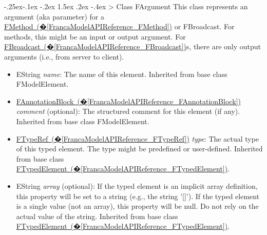 \documentclass[a4paper,10pt]{scrreprt}
\makeatletter
\renewcommand\subsection{\medskip\@startsection{subsection}{2}{\z@}%
  {-.25ex\@plus -.1ex \@minus -.2ex}%
  {1.5ex \@plus .2ex \@minus -.4ex}%
  {\ifnum \scr@compatibility>\@nameuse{scr@v@2.96}\relax
    \setlength{\parfillskip}{\z@ plus 1fil}\fi
    \raggedsection\normalfont\sectfont\nobreak\size@subsection
  }%
}
\newlength{\XdocItemIndent}
\makeatother
\begin{document}
\subsection{Class FArgument}
\label{FrancaModelAPIReference_FArgument}
This class represents an argument (aka parameter) for
a \hyperref[FrancaModelAPIReference_FMethod]{FMethod~(�\ref*{FrancaModelAPIReference_FMethod})} or FBroadcast. For methods, this might be
an input or output argument. For \hyperref[FrancaModelAPIReference_FBroadcast]{FBroadcast~(�\ref*{FrancaModelAPIReference_FBroadcast})}s, there are only
output arguments (i.e., from server to client).
\setlength{\XdocItemIndent}{\textwidth}
\begin{itemize}
\addtolength{\XdocItemIndent}{-2.5em}
\item \begin{minipage}[t]{\XdocItemIndent}
EString \textit{name}: The name of this element.
		 Inherited from base class FModelElement.

\end{minipage}
\item \begin{minipage}[t]{\XdocItemIndent}
\hyperref[FrancaModelAPIReference_FAnnotationBlock]{FAnnotationBlock~(�\ref*{FrancaModelAPIReference_FAnnotationBlock})} \textit{comment} (optional): The structured comment for this element (if any).
		 Inherited from base class FModelElement.

\end{minipage}
\item \begin{minipage}[t]{\XdocItemIndent}
\hyperref[FrancaModelAPIReference_FTypeRef]{FTypeRef~(�\ref*{FrancaModelAPIReference_FTypeRef})} \textit{type}: The actual type of this typed element. The type might be predefined or user-defined.
		 Inherited from base class \hyperref[FrancaModelAPIReference_FTypedElement]{FTypedElement~(�\ref*{FrancaModelAPIReference_FTypedElement})}.

\end{minipage}
\item \begin{minipage}[t]{\XdocItemIndent}
EString \textit{array} (optional): If the typed element is an implicit array definition, this property will be set to a string (e.g., the string '[]'). If the typed element is a single value (not an array), this property will be null. Do not rely on the actual value of the string.
		 Inherited from base class \hyperref[FrancaModelAPIReference_FTypedElement]{FTypedElement~(�\ref*{FrancaModelAPIReference_FTypedElement})}.

\end{minipage}
\end{itemize}
\addtolength{\XdocItemIndent}{2.5em}
\end{document}
